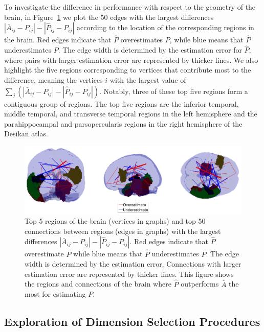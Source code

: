 To investigate the difference in performance with respect to the geometry of the brain, in Figure~\ref{fig:Diff_between_desikan} we plot the 50 edges with the largest differences $|\bar{A}_{ij} - P_{ij}| - |\hat{P}_{ij} - P_{ij}|$ according to the location of the corresponding regions in the brain. Red edges indicate that $\hat{P}$ overestimates $P$, while blue means that $\hat{P}$ underestimates $P$. The edge width is determined by the estimation error for $\hat{P}$, where pairs with larger estimation error are represented by thicker lines.
We also highlight the five regions corresponding to vertices that contribute most to the difference, meaning the vertices $i$ with the largest value of $\sum_j (|\bar{A}_{ij} - P_{ij}| - |\hat{P}_{ij} - P_{ij}|)$.
Notably, three of these top five regions form a contiguous group of regions.
The top five regions are the inferior temporal, middle temporal, and transverse temporal regions in the left hemisphere and the parahippocampal and parsopercularis regions in the right hemisphere of the Desikan atlas.

\begin{figure}[!htbp]
\centering
\includegraphics[width=1\textwidth]{./Figures/Diff_between_desikan.png}
\caption[Top 5 regions of the brain and top 50 connections between regions with the largest differences between two estimators]{Top 5 regions of the brain (vertices in graphs) and top 50 connections between regions (edges in graphs) with the largest differences $|\bar{A}_{ij} - P_{ij}| - |\hat{P}_{ij} - P_{ij}|$.
Red edges indicate that $\hat{P}$ overestimate $P$ while blue means that $\hat{P}$ underestimates $P$. The edge width is determined by the estimation error. Connections with larger estimation error are represented by thicker lines. This figure shows the regions and connections of the brain where $\hat{P}$ outperforms $\bar{A}$ the most for estimating $P$.}
\label{fig:Diff_between_desikan}
\end{figure}

\subsection{Exploration of Dimension Selection Procedures}

